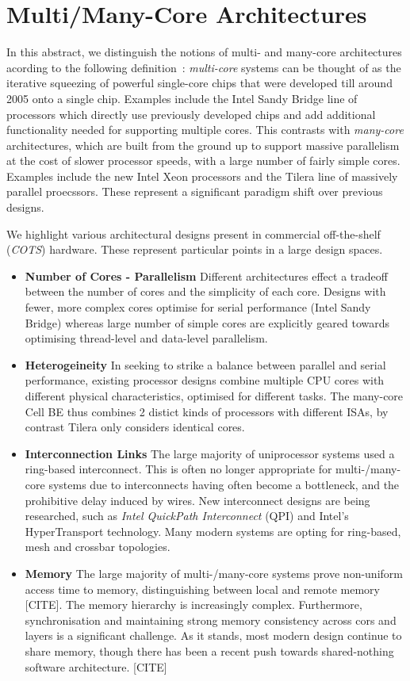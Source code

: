 \section{Multi/Many-Core Architectures}
\label{sec:overview}
In this abstract, we distinguish the notions of multi- and many-core
architectures acording to the following definition~\cite{Re:12}:
\emph{multi-core} systems can be thought of as the iterative squeezing of powerful
 single-core chips that
were developed till around 2005 onto a single chip. Examples include the
 Intel Sandy Bridge line of processors which directly use previously developed chips
and add additional functionality needed for supporting multiple cores. This
contrasts with \emph{many-core} architectures, which are built from the ground up 
to support massive parallelism at the cost of slower processor speeds,
with a large number of fairly simple cores.  Examples include
the new Intel Xeon processors and the Tilera line of massively parallel proecssors.
These represent a significant paradigm shift over previous designs.

We highlight various architectural designs present in commercial off-the-shelf
(\emph{COTS}) hardware. These represent particular points in a large design
spaces.
\begin{itemize}
\item {\bf Number of Cores - Parallelism} Different architectures effect a tradeoff between the
number of cores and the simplicity of each core. Designs with fewer,
more complex cores optimise for serial performance (Intel Sandy Bridge)
whereas large number of simple cores are explicitly geared towards
optimising thread-level and data-level parallelism.
\item {\bf Heterogeineity} In seeking to strike a balance between parallel and
serial performance, existing processor designs combine multiple CPU cores with
different physical characteristics, optimised for different tasks. The many-core
Cell BE thus combines 2 distict kinds of processors with different ISAs, by
contrast Tilera only considers identical cores.
\item {\bf Interconnection Links} The large majority of uniprocessor systems
used a ring-based interconnect. This is often no longer appropriate for
multi-/many-core systems due to interconnects having often become a bottleneck,
and the prohibitive delay induced by wires. New interconnect designs are being researched,
such as \emph{Intel QuickPath Interconnect} (QPI) and  Intel's HyperTransport technology.
Many modern systems are opting for ring-based, mesh and crossbar topologies.
\item {\bf Memory} The large majority of multi-/many-core systems prove
non-uniform access time to memory, distinguishing between local and remote
memory [CITE]. The memory hierarchy is increasingly complex.
Furthermore, synchronisation and maintaining strong memory consistency across
cors and layers is a significant challenge. As it stands, most modern
design continue to share memory, though there has been a recent push
towards shared-nothing software architecture. [CITE]
\end{itemize}
